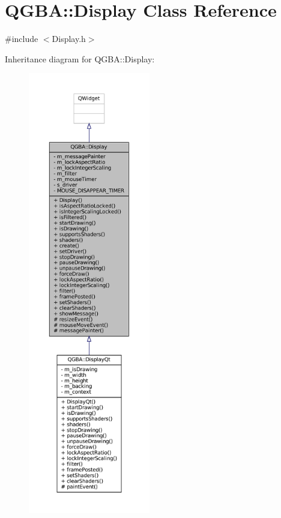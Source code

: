 \hypertarget{class_q_g_b_a_1_1_display}{}\section{Q\+G\+BA\+:\+:Display Class Reference}
\label{class_q_g_b_a_1_1_display}


{\ttfamily \#include $<$Display.\+h$>$}



Inheritance diagram for Q\+G\+BA\+:\+:Display\+:
\nopagebreak
\begin{figure}[H]
\begin{center}
\leavevmode
\includegraphics[height=550pt]{class_q_g_b_a_1_1_display__inherit__graph}
\end{center}
\end{figure}


